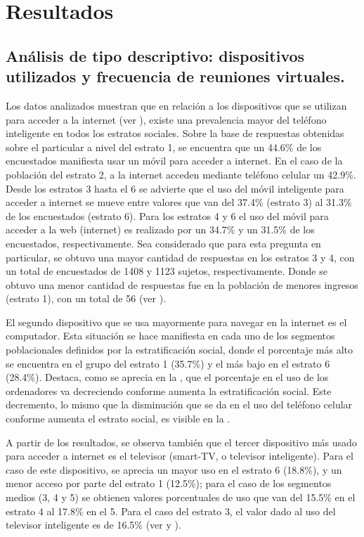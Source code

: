 \documentclass[spanish]{textolivre}
\begin{document}
\section{Resultados}
\subsection{Análisis de tipo descriptivo: dispositivos utilizados y frecuencia de reuniones virtuales.}

Los datos analizados muestran que en relación a los dispositivos que se utilizan para acceder a la internet (ver ), existe una prevalencia mayor del teléfono inteligente en todos los estratos sociales. Sobre la base de respuestas obtenidas sobre el particular a nivel del estrato 1, se encuentra que un 44.6\% de los encuestados manifiesta usar un móvil para acceder a internet. En el caso de la población del estrato 2, a la internet acceden mediante teléfono celular un 42.9\%. Desde los estratos 3 hasta el 6 se advierte que el uso del móvil inteligente para acceder a internet se mueve entre valores que van del 37.4\% (estrato 3) al 31.3\% de los encuestados (estrato 6). Para los estratos 4 y 6 el uso del móvil para acceder a la web (internet) es realizado por un 34.7\% y un 31.5\% de los encuestados, respectivamente. Sea considerado que para esta pregunta en particular, se obtuvo una mayor cantidad de respuestas en los estratos 3 y 4, con un total de encuestados de 1408 y 1123 sujetos, respectivamente. Donde se obtuvo una menor cantidad de respuestas fue en la población de menores ingresos (estrato 1), con un total de 56 (ver ).

El segundo dispositivo que se usa mayormente para navegar en la internet es el computador. Esta situación se hace manifiesta en cada uno de los segmentos poblacionales definidos por la estratificación social, donde el porcentaje más alto se encuentra en el grupo del estrato 1 (35.7\%) y el más bajo en el estrato 6 (28.4\%). Destaca, como se aprecia en la , que el porcentaje en el uso de los ordenadores va decreciendo conforme aumenta la estratificación social. Este decremento, lo mismo que la disminución que se da en el uso del teléfono celular conforme aumenta el estrato social, es visible en la .

A partir de los resultados, se observa también que el tercer dispositivo más usado para acceder a internet es el televisor (smart-TV, o televisor inteligente). Para el caso de este dispositivo, se aprecia un mayor uso en el estrato 6 (18.8\%), y un menor acceso por parte del estrato 1 (12.5\%); para el caso de los segmentos medios (3, 4 y 5) se obtienen valores porcentuales de uso que van del 15.5\% en el estrato 4 al 17.8\% en el 5. Para el caso del estrato 3, el valor dado al uso del televisor inteligente es de 16.5\% (ver  y ).
\end{document}
